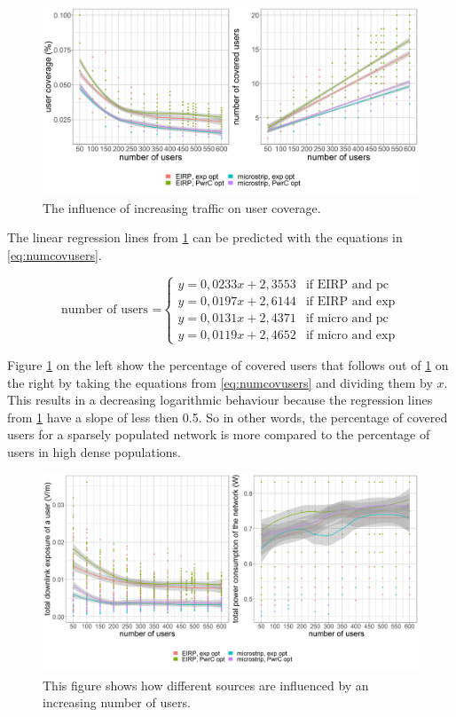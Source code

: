 \begin{figure}[h!]
  \includegraphics[width=\textwidth]{../results/s2/uvsnumdronesAndCov.png}
  \caption{The influence of increasing traffic on user coverage.}
  \label{fig:s2uvsnumcovusers}
\end{figure}

The linear regression lines from \ref{fig:s2uvsnumcovusers} can be predicted with the equations in \ref{eq:numcovusers}.

\begin{equation}
\text{number of users =}
    \begin{cases}
      y = 0,0233x + 2,3553 & \text{if EIRP and pc}\\
      y = 0,0197x + 2,6144  & \text{if EIRP and exp}\\
      y = 0,0131x + 2,4371  & \text{if micro and pc}\\
      y = 0,0119x + 2,4652  & \text{if micro and exp}
    \end{cases} 
    \label{eq:numcovusers}      
\end{equation}

Figure \ref{fig:s2uvsnumcovusers} on the left show the percentage of covered users that follows out of \ref{fig:s2uvsnumcovusers} on the right by taking the equations from \ref{eq:numcovusers} and dividing them by $x$.
This results in a decreasing logarithmic behaviour because the regression lines from  \ref{fig:s2uvsnumcovusers} have a slope of less then 0.5.
So in other words, the  percentage of covered users for a sparsely populated network is more compared to the percentage of users in high dense populations.

\begin{figure}[h!]
  \includegraphics[width=\textwidth]{../results/s2/uvsdlAndPc.png}
  \caption{This figure shows how different sources are influenced by an increasing number of users. }
  \label{fig:s2b_dlAndPc}
\end{figure}

